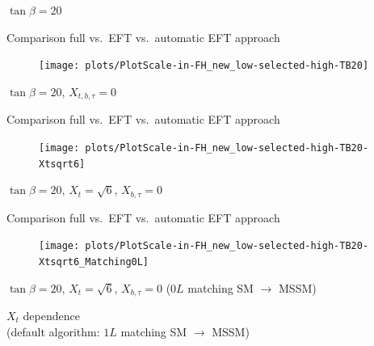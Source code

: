 \documentclass[hyperref={pdfpagelabels=false},ngerman]{beamer}
\begin{document}

\begin{frame}[noframenumbering]
  \begin{center}
    $\tan\beta = 20$
  \end{center}
\end{frame}


\begin{frame}[noframenumbering]{Comparison full vs.\ EFT vs.\ automatic EFT approach}
  \begin{figure}
    \centering
    \texttt{[image: plots/PlotScale-in-FH\_new\_low-selected-high-TB20]}
  \end{figure}
  $\tan\beta = 20$, $X_{t,b,\tau} = 0$
\end{frame}

\begin{frame}[noframenumbering]{Comparison full vs.\ EFT vs.\ automatic EFT approach}
  \begin{figure}
    \centering
    \texttt{[image: plots/PlotScale-in-FH\_new\_low-selected-high-TB20-Xtsqrt6]}
  \end{figure}
  $\tan\beta = 20$, $X_{t} = \sqrt{6}$, $X_{b,\tau} = 0$
\end{frame}

\begin{frame}[noframenumbering]{Comparison full vs.\ EFT vs.\ automatic EFT approach}
  \begin{figure}
    \centering
    \texttt{[image: plots/PlotScale-in-FH\_new\_low-selected-high-TB20-Xtsqrt6\_Matching0L]}
  \end{figure}
  $\tan\beta = 20$, $X_{t} = \sqrt{6}$, $X_{b,\tau} = 0$ ($0L$ matching SM $\rightarrow$ MSSM)
\end{frame}


\begin{frame}[noframenumbering]
  \begin{center}
    {\Large $X_t$ dependence}\\[1em]
    (default algorithm: $1L$ matching SM $\rightarrow$ MSSM)
  \end{center}
\end{frame}
\end{document}
